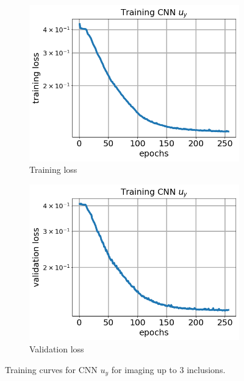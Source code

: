 \documentclass[12pt]{article}
\newcommand{\nhgfigheight}{4.0cm}
\begin{document}
\begin{figure}[h]
  \centering
  \begin{subfigure}[b]{0.45\linewidth}
    \includegraphics[totalheight=\nhgfigheight]{Figures/final3/training/uy/field_imagesy_plot_loss.png}
    \caption{Training loss}
  \end{subfigure}
  \begin{subfigure}[b]{0.45\linewidth}
    \includegraphics[totalheight=\nhgfigheight]{Figures/final3/training/uy/field_imagesy_plot_val_loss.png}
    \caption{Validation loss}
  \end{subfigure}
  \caption{\label{fig:threeinc:trainuy} Training curves for CNN $u_y$ for imaging up to 3 inclusions.}
\end{figure}
\end{document}
